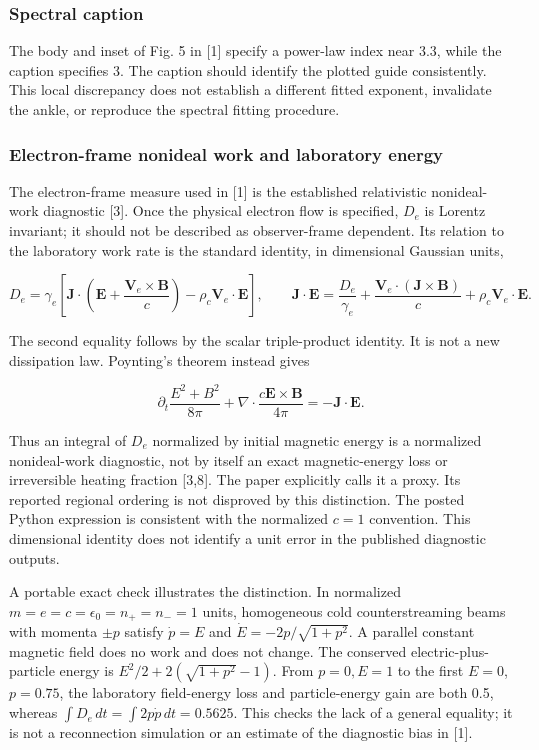 \subsubsection{Spectral caption}\label{spectral-caption}

The body and inset of Fig. 5 in {[}1{]} specify a power-law index near
3.3, while the caption specifies 3. The caption should identify the
plotted guide consistently. This local discrepancy does not establish a
different fitted exponent, invalidate the ankle, or reproduce the
spectral fitting procedure.

\subsubsection{Electron-frame nonideal work and laboratory
energy}\label{electron-frame-nonideal-work-and-laboratory-energy}

The electron-frame measure used in {[}1{]} is the established
relativistic nonideal-work diagnostic {[}3{]}. Once the physical
electron flow is specified, \(D_e\) is Lorentz invariant; it should not
be described as observer-frame dependent. Its relation to the laboratory
work rate is the standard identity, in dimensional Gaussian units,

\[
D_e=\gamma_e\left[
\mathbf J\cdot\left(\mathbf E+
\frac{\mathbf V_e\times\mathbf B}{c}\right)
-\rho_c\mathbf V_e\cdot\mathbf E\right],
\qquad
\mathbf J\cdot\mathbf E=
\frac{D_e}{\gamma_e}+
\frac{\mathbf V_e\cdot(\mathbf J\times\mathbf B)}c
+\rho_c\mathbf V_e\cdot\mathbf E.
\]

The second equality follows by the scalar triple-product identity. It is
not a new dissipation law. Poynting's theorem instead gives

\[
\partial_t\frac{E^2+B^2}{8\pi}
+\nabla\cdot\frac{c\mathbf E\times\mathbf B}{4\pi}
=-\mathbf J\cdot\mathbf E.
\]

Thus an integral of \(D_e\) normalized by initial magnetic energy is a
normalized nonideal-work diagnostic, not by itself an exact
magnetic-energy loss or irreversible heating fraction {[}3,8{]}. The
paper explicitly calls it a proxy. Its reported regional ordering is not
disproved by this distinction. The posted Python expression is
consistent with the normalized \(c=1\) convention. This dimensional
identity does not identify a unit error in the published diagnostic
outputs.

A portable exact check illustrates the distinction. In normalized
\(m=e=c=\epsilon_0=n_+=n_-=1\) units, homogeneous cold counterstreaming
beams with momenta \(\pm p\) satisfy \(\dot p=E\) and
\(\dot E=-2p/\sqrt{1+p^2}\). A parallel constant magnetic field does no
work and does not change. The conserved electric-plus-particle energy is
\(E^2/2+2(\sqrt{1+p^2}-1)\). From \(p=0,E=1\) to the first \(E=0\),
\(p=0.75\), the laboratory field-energy loss and particle-energy gain
are both 0.5, whereas \(\int D_e\,dt=\int2p\dot p\,dt=0.5625\). This
checks the lack of a general equality; it is not a reconnection
simulation or an estimate of the diagnostic bias in {[}1{]}.

